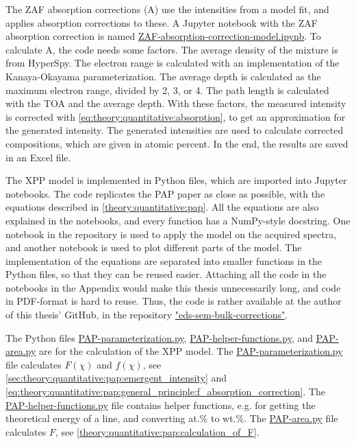 The ZAF absorption corrections (A) use the intensities from a model fit, and applies absorption corrections to these.
A Jupyter notebook with the ZAF absorption correction is named \href{https://github.com/brynjarmorka/eds-sem-bulk-corrections/blob/main/ZAF-absorption-correction-model.ipynb}{ZAF-absorption-correction-model.ipynb}.
To calculate A, the code needs some factors. 
The average density of the mixture is from HyperSpy.
The electron range is calculated with an implementation of the Kanaya-Okayama parameterization.
The average depth is calculated as the maximum electron range, divided by 2, 3, or 4.
The path length is calculated with the TOA and the average depth.
With these factors, the measured intensity is corrected with \cref{eq:theory:quantitative:absorption}, to get an approximation for the generated intensity. 
The generated intensities are used to calculate corrected compositions, which are given in atomic percent.
In the end, the results are saved in an Excel file.


The XPP model is implemented in Python files, which are imported into Jupyter notebooks.
The code replicates the PAP paper \cite{pap_1991} as close as possible, with the equations described in \cref{theory:quantitative:pap}.
All the equations are also explained in the notebooks, and every function has a NumPy-style docstring.
One notebook in the repository is used to apply the model on the acquired spectra, and another notebook is used to plot different parts of the model.
The implementation of the equations are separated into smaller functions in the Python files, so that they can be reused easier.
Attaching all the code in the notebooks in the Appendix would make this thesis unnecessarily long, and code in PDF-format is hard to reuse.
Thus, the code is rather available at the author of this thesis' GitHub, in the repository \href{https://github.com/brynjarmorka/eds-sem-bulk-corrections}{"eds-sem-bulk-corrections"}.


The Python files 
\href{https://github.com/brynjarmorka/eds-sem-bulk-corrections/blob/main/PAP_functions/PAP_parameterization.py}{PAP-parameterization.py}, 
\href{https://github.com/brynjarmorka/eds-sem-bulk-corrections/blob/main/PAP_functions/PAP_helper_functions.py}{PAP-helper-functions.py}, and 
\href{https://github.com/brynjarmorka/eds-sem-bulk-corrections/blob/main/PAP_functions/PAP_area_F.py}{PAP-area.py} are for the calculation of the XPP model.
The 
\href{https://github.com/brynjarmorka/eds-sem-bulk-corrections/blob/main/PAP_functions/PAP_parameterization.py}{PAP-parameterization.py}
file calculates $F(\chi)$ and $f(\chi)$, see \cref{sec:theory:quantitative:pap:emergent_intensity} and \cref{eq:theory:quantitative:pap:general_principle:f_absorption_correction}.
The 
\href{https://github.com/brynjarmorka/eds-sem-bulk-corrections/blob/main/PAP_functions/PAP_helper_functions.py}{PAP-helper-functions.py}
file contains helper functions, e.g. for getting the theoretical energy of a line, and converting at.\% to wt.\%.
The 
\href{https://github.com/brynjarmorka/eds-sem-bulk-corrections/blob/main/PAP_functions/PAP_area_F.py}{PAP-area.py}
file calculates $F$, see \cref{theory:quantitative:pap:calculation_of_F}.
